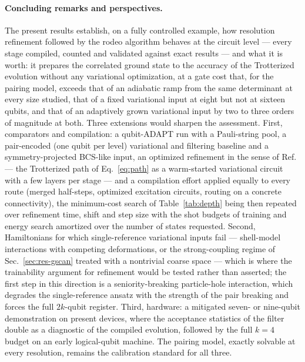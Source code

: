 \documentclass[
  aps,            %
  prc,            %
  reprint,        %
  superscriptaddress,
  floatfix,
  nofootinbib
]{revtex4-2}
\begin{document}
\paragraph{Concluding remarks and perspectives.}
The present results establish, on a fully controlled example, how resolution
refinement followed by the rodeo algorithm behaves at the circuit level ---
every stage compiled, counted and validated against exact results --- and
what it is worth: it prepares the correlated ground state to the accuracy of
the Trotterized evolution without any variational optimization, at a gate
cost that, for the pairing model, exceeds that of an adiabatic ramp from
the same determinant at every size studied, that of a fixed variational
input at eight but not at sixteen qubits, and that of an adaptively grown
variational input by two to three orders of magnitude at both.  Three extensions would sharpen the assessment.
First, comparators and compilation: a qubit-ADAPT run with a Pauli-string
pool, a pair-encoded (one qubit per level) variational and filtering
baseline and a symmetry-projected BCS-like input, an optimized refinement in the sense of
Ref.~\cite{Sadia2026} --- the Trotterized path of Eq.~\eqref{eq:path} as a
warm-started variational circuit with a few layers per stage --- and a
compilation effort applied equally to every route (merged half-steps,
optimized excitation circuits, routing on a concrete connectivity), the
minimum-cost search of Table~\ref{tab:depth} being then repeated over
refinement time, shift and step size with the shot budgets of training and
energy search amortized over the number of states requested.  Second, Hamiltonians for which single-reference
variational inputs fail --- shell-model interactions with competing
deformations, or the strong-coupling regime of Sec.~\ref{sec:res-gscan}
treated with a nontrivial coarse space --- which is where the trainability
argument for refinement would be tested rather than asserted; the first
step in this direction is a seniority-breaking particle-hole interaction,
which degrades the single-reference ansatz with the strength of the pair
breaking and forces the full $2k$-qubit register.  Third,
hardware: a mitigated seven- or nine-qubit demonstration on present devices,
where the acceptance statistics of the filter double as a diagnostic of the
compiled evolution, followed by the full $k=4$ budget on an early
logical-qubit machine.  The pairing model, exactly solvable at every
resolution, remains the calibration standard for all three.

\end{document}

